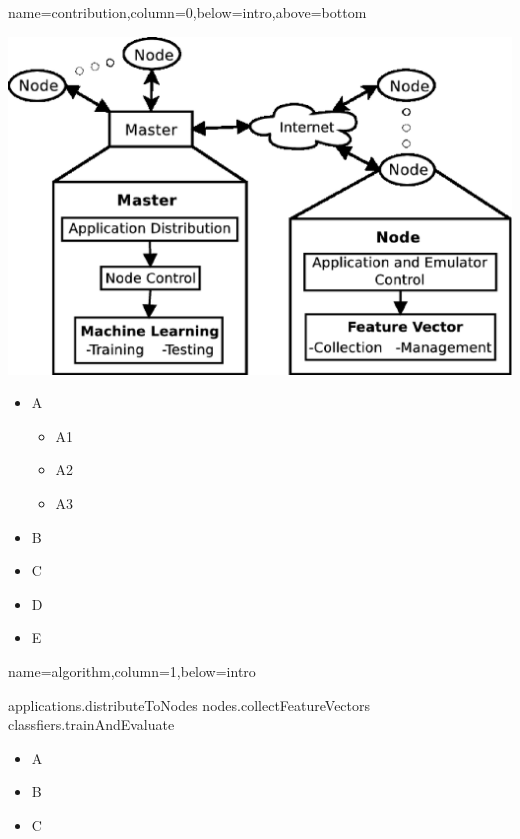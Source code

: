 \documentclass[landscape,specialSize,fontscale=0.3]{baposter}
\begin{document}
\begin{poster}
    {name=contribution,column=0,below=intro,above=bottom}{
  \includegraphics[width=\linewidth]{stream}
  \begin{itemize}
    \item A
    \begin{itemize}\item A1 \item A2 \item A3\end{itemize}
    \item B \item C \item D \item E
  \end{itemize}
}

    {name=algorithm,column=1,below=intro}{
  \begin{algorithm}[H]
      \dontprintsemicolon
      \linesnumbered
      \nl applications.distributeToNodes \;
      \nl nodes.collectFeatureVectors \;
      \nl classfiers.trainAndEvaluate \;
  \end{algorithm}
  \begin{itemize}\item A \item B \item C\end{itemize}
}


\end{poster}
\end{document}
